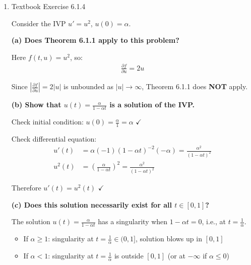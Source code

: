 \documentclass[reqno]{exam}
\begin{document}
\begin{enumerate}
\begin{solution}
          Conclusion: Does \textbf{NOT} satisfy Theorem 6.1.2 because $\frac{\partial f}{\partial u}$ is unbounded (no finite $L$ exists)

        \end{solution}


  \item Textbook Exercise 6.1.4
        \begin{solution}
          Consider the IVP $u' = u^2$, $u(0) = \alpha$.

          \medskip

          \textbf{(a) Does Theorem 6.1.1 apply to this problem?}

          Here $f(t,u) = u^2$, so:
          \begin{align*}
            \frac{\partial f}{\partial u} = 2u
          \end{align*}

          Since $\left|\frac{\partial f}{\partial u}\right| = 2|u|$ is unbounded as $|u| \to \infty$, Theorem 6.1.1 does \textbf{NOT} apply.

          \medskip

          \textbf{(b) Show that $u(t) = \frac{\alpha}{1-\alpha t}$ is a solution of the IVP.}

          Check initial condition: $u(0) = \frac{\alpha}{1} = \alpha$ \quad $\checkmark$

          Check differential equation:
          \begin{align*}
            u'(t)  & = \alpha(-1)(1-\alpha t)^{-2}(-\alpha) = \frac{\alpha^2}{(1-\alpha t)^2}     \\
            u^2(t) & = \left(\frac{\alpha}{1-\alpha t}\right)^2 = \frac{\alpha^2}{(1-\alpha t)^2}
          \end{align*}

          Therefore $u'(t) = u^2(t)$ \quad $\checkmark$

          \medskip

          \textbf{(c) Does this solution necessarily exist for all $t \in [0,1]$?}

          The solution $u(t) = \frac{\alpha}{1-\alpha t}$ has a singularity when $1 - \alpha t = 0$, i.e., at $t = \frac{1}{\alpha}$.

          \begin{itemize}
            \item If $\alpha \geq 1$: singularity at $t = \frac{1}{\alpha} \in (0,1]$, solution blows up in $[0,1]$
            \item If $\alpha < 1$: singularity at $t = \frac{1}{\alpha}$ is outside $[0,1]$ (or at $-\infty$ if $\alpha \leq 0$)
          \end{itemize}


\end{solution}
\end{enumerate}
\end{document}
